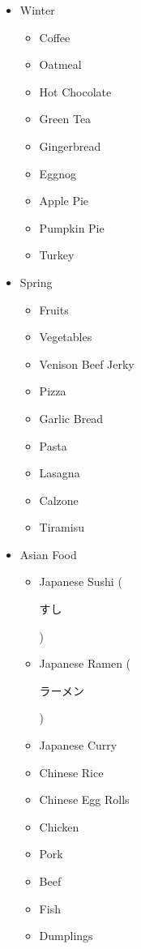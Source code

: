 \documentclass[12pt]{article}
\begin{document}
\begin{multicols}{2}
\begin{itemize}[noitemsep]
\columnbreak
\item Winter
\begin{itemize}[noitemsep,nosep]
\item Coffee
\item Oatmeal
\item Hot Chocolate
\item Green Tea
\item Gingerbread
\item Eggnog
\item Apple Pie
\item Pumpkin Pie
\item Turkey
\end{itemize}
\item Spring
\begin{itemize}[noitemsep,nosep]
\item Fruits
\item Vegetables
\item Venison Beef Jerky
\item Pizza
\item Garlic Bread
\item Pasta
\item Lasagna
\item Calzone
\item Tiramisu
\end{itemize}
\item Asian Food
\begin{itemize}[noitemsep,nosep]
\item Japanese Sushi (\begin{CJK}{UTF8}{min}すし\end{CJK})
\item Japanese Ramen (\begin{CJK}{UTF8}{min}ラーメン\end{CJK})
\item Japanese Curry
\item Chinese Rice
\item Chinese Egg Rolls
\item Chicken
\item Pork
\item Beef
\item Fish
\item Dumplings
\end{itemize}
\end{itemize}
\end{multicols}
\end{document}
